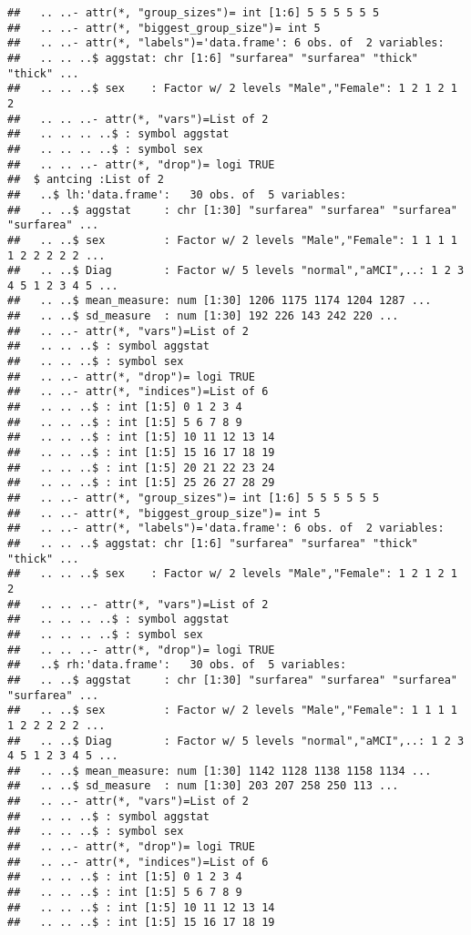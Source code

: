 \documentclass[12pt]{article}\usepackage[]{graphicx}\usepackage[]{color}
\makeatletter
\newenvironment{kframe}{%
 \def\at@end@of@kframe{}%
 \ifinner\ifhmode%
  \def\at@end@of@kframe{\end{minipage}}%
  \begin{minipage}{\columnwidth}%
 \fi\fi%
 \def\FrameCommand##1{\hskip\@totalleftmargin \hskip-\fboxsep
 \colorbox{shadecolor}{##1}\hskip-\fboxsep
     \hskip-\linewidth \hskip-\@totalleftmargin \hskip\columnwidth}%
 \MakeFramed {\advance\hsize-\width
   \@totalleftmargin\z@ \linewidth\hsize
   \@setminipage}}%
 {\par\unskip\endMakeFramed%
 \at@end@of@kframe}
\newenvironment{knitrout}{}{} %
\makeatother
\begin{document}
\begin{knitrout}
\begin{kframe}
\begin{verbatim}
##   .. ..- attr(*, "group_sizes")= int [1:6] 5 5 5 5 5 5
##   .. ..- attr(*, "biggest_group_size")= int 5
##   .. ..- attr(*, "labels")='data.frame':	6 obs. of  2 variables:
##   .. .. ..$ aggstat: chr [1:6] "surfarea" "surfarea" "thick" "thick" ...
##   .. .. ..$ sex    : Factor w/ 2 levels "Male","Female": 1 2 1 2 1 2
##   .. .. ..- attr(*, "vars")=List of 2
##   .. .. .. ..$ : symbol aggstat
##   .. .. .. ..$ : symbol sex
##   .. .. ..- attr(*, "drop")= logi TRUE
##  $ antcing :List of 2
##   ..$ lh:'data.frame':	30 obs. of  5 variables:
##   .. ..$ aggstat     : chr [1:30] "surfarea" "surfarea" "surfarea" "surfarea" ...
##   .. ..$ sex         : Factor w/ 2 levels "Male","Female": 1 1 1 1 1 2 2 2 2 2 ...
##   .. ..$ Diag        : Factor w/ 5 levels "normal","aMCI",..: 1 2 3 4 5 1 2 3 4 5 ...
##   .. ..$ mean_measure: num [1:30] 1206 1175 1174 1204 1287 ...
##   .. ..$ sd_measure  : num [1:30] 192 226 143 242 220 ...
##   .. ..- attr(*, "vars")=List of 2
##   .. .. ..$ : symbol aggstat
##   .. .. ..$ : symbol sex
##   .. ..- attr(*, "drop")= logi TRUE
##   .. ..- attr(*, "indices")=List of 6
##   .. .. ..$ : int [1:5] 0 1 2 3 4
##   .. .. ..$ : int [1:5] 5 6 7 8 9
##   .. .. ..$ : int [1:5] 10 11 12 13 14
##   .. .. ..$ : int [1:5] 15 16 17 18 19
##   .. .. ..$ : int [1:5] 20 21 22 23 24
##   .. .. ..$ : int [1:5] 25 26 27 28 29
##   .. ..- attr(*, "group_sizes")= int [1:6] 5 5 5 5 5 5
##   .. ..- attr(*, "biggest_group_size")= int 5
##   .. ..- attr(*, "labels")='data.frame':	6 obs. of  2 variables:
##   .. .. ..$ aggstat: chr [1:6] "surfarea" "surfarea" "thick" "thick" ...
##   .. .. ..$ sex    : Factor w/ 2 levels "Male","Female": 1 2 1 2 1 2
##   .. .. ..- attr(*, "vars")=List of 2
##   .. .. .. ..$ : symbol aggstat
##   .. .. .. ..$ : symbol sex
##   .. .. ..- attr(*, "drop")= logi TRUE
##   ..$ rh:'data.frame':	30 obs. of  5 variables:
##   .. ..$ aggstat     : chr [1:30] "surfarea" "surfarea" "surfarea" "surfarea" ...
##   .. ..$ sex         : Factor w/ 2 levels "Male","Female": 1 1 1 1 1 2 2 2 2 2 ...
##   .. ..$ Diag        : Factor w/ 5 levels "normal","aMCI",..: 1 2 3 4 5 1 2 3 4 5 ...
##   .. ..$ mean_measure: num [1:30] 1142 1128 1138 1158 1134 ...
##   .. ..$ sd_measure  : num [1:30] 203 207 258 250 113 ...
##   .. ..- attr(*, "vars")=List of 2
##   .. .. ..$ : symbol aggstat
##   .. .. ..$ : symbol sex
##   .. ..- attr(*, "drop")= logi TRUE
##   .. ..- attr(*, "indices")=List of 6
##   .. .. ..$ : int [1:5] 0 1 2 3 4
##   .. .. ..$ : int [1:5] 5 6 7 8 9
##   .. .. ..$ : int [1:5] 10 11 12 13 14
##   .. .. ..$ : int [1:5] 15 16 17 18 19

\end{verbatim}
\end{kframe}
\end{knitrout}
\end{document}
